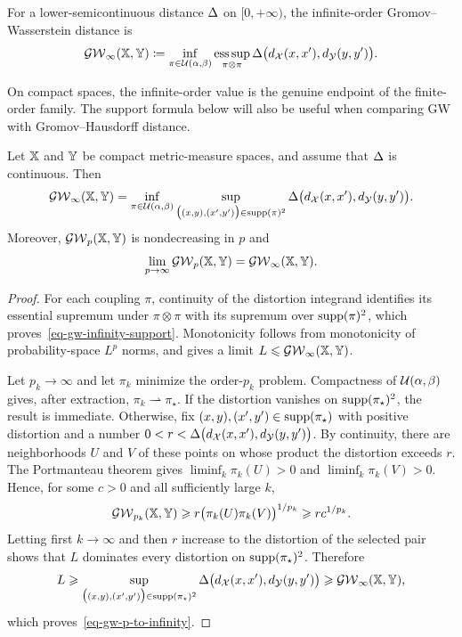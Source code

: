 \begin{defn}\label{def-gromov-wasserstein-infinity}
	For a lower-semicontinuous distance $\Delta$ on $[0,+\infty)$, the infinite-order Gromov--Wasserstein distance is
	\begin{equation}\label{eq-gw-infinity}
		\operatorname{\mathcal{GW}}_\infty(\mathbb{X},\mathbb{Y})
		\coloneqq
		\inf_{\pi\in\mathcal{U}(\alpha,\beta)}
		\operatorname*{ess\,sup}_{\pi\otimes\pi}
		\Delta\bigl(d_{\mathcal{X}}(x,x'),d_{\mathcal{Y}}(y,y')\bigr).
	\end{equation}
\end{defn}
On compact spaces, the infinite-order value is the genuine endpoint of the finite-order family. The support formula below will also be useful when comparing GW with Gromov--Hausdorff distance.
\begin{prop}\label{prop-gw-infinite-order-limit}
	Let $\mathbb{X}$ and $\mathbb{Y}$ be compact metric-measure spaces, and assume that $\Delta$ is continuous. Then
	\begin{equation}\label{eq-gw-infinity-support}
		\operatorname{\mathcal{GW}}_\infty(\mathbb{X},\mathbb{Y})
		=
		\inf_{\pi\in\mathcal{U}(\alpha,\beta)}
		\sup_{\bigl((x,y),(x',y')\bigr)\in\operatorname{supp}(\pi)^2}
		\Delta\bigl(d_{\mathcal{X}}(x,x'),d_{\mathcal{Y}}(y,y')\bigr).
	\end{equation}
	Moreover, $\operatorname{\mathcal{GW}}_p(\mathbb{X},\mathbb{Y})$ is nondecreasing in $p$ and
	\begin{equation}\label{eq-gw-p-to-infinity}
		\lim_{p\to\infty}\operatorname{\mathcal{GW}}_p(\mathbb{X},\mathbb{Y})
		=
		\operatorname{\mathcal{GW}}_\infty(\mathbb{X},\mathbb{Y}).
	\end{equation}
\end{prop}
\begin{proof}
	For each coupling $\pi$, continuity of the distortion integrand identifies its essential supremum under $\pi\otimes\pi$ with its supremum over $\operatorname{supp}(\pi)^2$, which proves~\eqref{eq-gw-infinity-support}. Monotonicity follows from monotonicity of probability-space $L^p$ norms, and gives a limit $L\leqslant\operatorname{\mathcal{GW}}_\infty(\mathbb{X},\mathbb{Y})$.

	Let $p_k\to\infty$ and let $\pi_k$ minimize the order-$p_k$ problem. Compactness of $\mathcal{U}(\alpha,\beta)$ gives, after extraction, $\pi_k\rightharpoonup\pi_\star$. If the distortion vanishes on $\operatorname{supp}(\pi_\star)^2$, the result is immediate. Otherwise, fix $(x,y),(x',y')\in\operatorname{supp}(\pi_\star)$ with positive distortion and a number
	$0<r<\Delta\bigl(d_{\mathcal{X}}(x,x'),d_{\mathcal{Y}}(y,y')\bigr)$.
	By continuity, there are neighborhoods $U$ and $V$ of these points on whose product the distortion exceeds $r$. The Portmanteau theorem gives $\liminf_k\pi_k(U)>0$ and $\liminf_k\pi_k(V)>0$. Hence, for some $c>0$ and all sufficiently large $k$,
	\[
		\operatorname{\mathcal{GW}}_{p_k}(\mathbb{X},\mathbb{Y})
		\geqslant
		r\bigl(\pi_k(U)\pi_k(V)\bigr)^{1/p_k}
		\geqslant
		rc^{1/p_k}.
	\]
	Letting first $k\to\infty$ and then $r$ increase to the distortion of the selected pair shows that $L$ dominates every distortion on $\operatorname{supp}(\pi_\star)^2$. Therefore
	\[
		L
		\geqslant
		\sup_{\bigl((x,y),(x',y')\bigr)\in\operatorname{supp}(\pi_\star)^2}
		\Delta\bigl(d_{\mathcal{X}}(x,x'),d_{\mathcal{Y}}(y,y')\bigr)
		\geqslant
		\operatorname{\mathcal{GW}}_\infty(\mathbb{X},\mathbb{Y}),
	\]
	which proves~\eqref{eq-gw-p-to-infinity}.
\end{proof}
